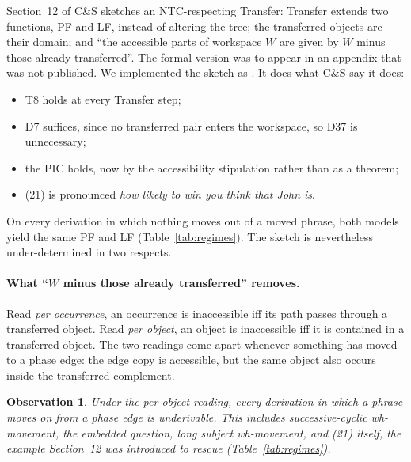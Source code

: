 \documentclass[11pt]{article}
\newcommand{\code}[1]{\texttt{\detokenize{#1}}}
\newcommand{\pf}[1]{\textit{#1}}
\newcommand{\Def}[1]{D#1}
\newcommand{\Thm}[1]{T#1}
\theoremstyle{definition}
\theoremstyle{plain}
\newtheorem{observation}{Observation}
\begin{document}
Section~12 of C\&S sketches an NTC-respecting Transfer: Transfer extends two
functions, PF and LF, instead of altering the tree; the transferred objects
are their domain; and ``the accessible parts of workspace $W$ are given by $W$
minus those already transferred''. The formal version was to appear in an
appendix that was not published. We implemented the sketch as
\code{NTCDerivation}. It does what C\&S say it does:
\begin{itemize}[leftmargin=*,itemsep=2pt]
\item \Thm{8} holds at every Transfer step;
\item \Def{7} suffices, since no transferred pair enters the workspace, so
  \Def{37} is unnecessary;
\item the PIC holds, now by the accessibility stipulation rather than as a
  theorem;
\item (21) is pronounced \pf{how likely to win you think that John is}.
\end{itemize}
On every derivation in which nothing moves out of a moved phrase, both models
yield the same PF and LF (Table~\ref{tab:regimes}). The sketch is
nevertheless under-determined in two respects.

\paragraph{What ``$W$ minus those already transferred'' removes.}
Read \emph{per occurrence}, an occurrence is inaccessible iff its path passes
through a transferred object. Read \emph{per object}, an object is
inaccessible iff it is contained in a transferred object. The two readings
come apart whenever something has moved to a phase edge: the edge copy is
accessible, but the same object also occurs inside the transferred
complement.

\begin{observation}
\label{obs:object}
Under the per-object reading, every derivation in which a phrase moves on
from a phase edge is underivable. This includes successive-cyclic
wh-movement, the embedded question, long subject wh-movement, and (21)
itself, the example Section~12 was introduced to rescue
(Table~\ref{tab:regimes}).
\end{observation}
\end{document}
